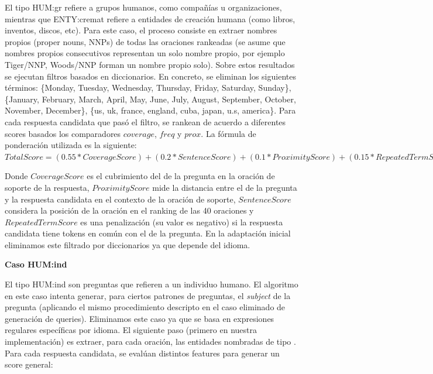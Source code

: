 El tipo HUM:gr refiere a grupos humanos, como compañías u organizaciones, mientras que ENTY:cremat refiere a entidades de creación humana (como libros, inventos, discos, etc).
Para este caso, el proceso consiste en extraer nombres propios (proper nouns, NNPs) de todas las oraciones rankeadas (se asume que nombres propios consecutivos representan un solo nombre propio, por ejemplo Tiger/NNP, Woods/NNP forman un nombre propio solo). Sobre estos resultados se ejecutan filtros basados en diccionarios. En concreto, se eliminan los siguientes términos: \{Monday, Tuesday, Wednesday, Thursday, Friday, Saturday, Sunday\}, \{January, February, March, April, May, June, July, August, September, October, November, December\}, \{us, uk, france, england, cuba, japan, u.s, america\}. Para cada respuesta candidata que pasó el filtro, se rankean de acuerdo a diferentes scores basados los comparadores $coverage$, $freq$ y $prox$.
La fórmula de ponderación utilizada es la siguiente: \\

$TotalScore = (0.55 * CoverageScore) + (0.2 * SentenceScore)	+ (0.1 * ProximityScore) + (0.15 * RepeatedTermScore)$

Donde $CoverageScore$ es el cubrimiento del  de la pregunta en la oración de soporte de la respuesta, $ProximityScore$ mide la distancia entre el  de la pregunta y la respuesta candidata en el contexto de la oración de soporte, $SentenceScore$ considera la posición de la oración en el ranking de las 40 oraciones y $RepeatedTermScore$ es una penalización (su valor es negativo) si la respuesta candidata tiene tokens en común con el  de la pregunta. En la adaptación inicial eliminamos este filtrado por diccionarios ya que depende del idioma. \newline

\textbf{Caso HUM:ind} \newline

El tipo HUM:ind son preguntas que refieren a un individuo humano. El algoritmo en este caso intenta generar, para ciertos patrones de preguntas, el \textit{subject} de la pregunta (aplicando el mismo procedimiento descripto en el caso eliminado de generación de queries). Eliminamos este caso ya que se basa en expresiones regulares específicas por idioma.
El siguiente paso (primero en nuestra implementación) es extraer, para cada oración, las entidades nombradas de tipo . Para cada respuesta candidata, se evalúan distintos features para generar un score general:

